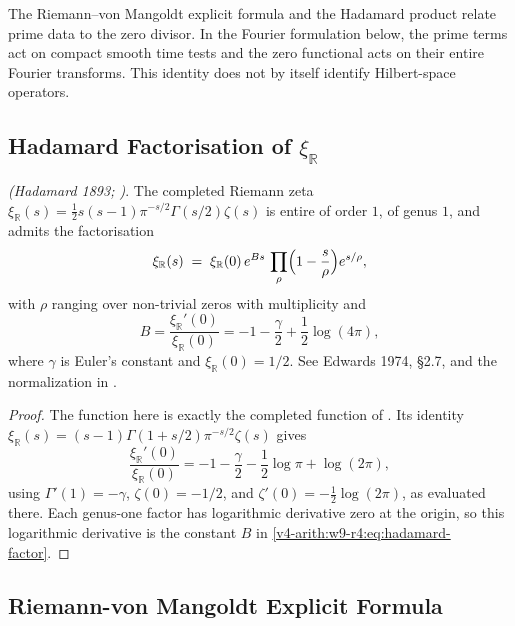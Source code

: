 The Riemann--von Mangoldt explicit formula and the Hadamard product
relate prime data to the zero divisor. In the Fourier formulation below,
the prime terms act on compact smooth time tests and the zero
functional acts on their entire Fourier transforms. This identity
does not by itself identify Hilbert-space operators.

\subsection{Hadamard Factorisation of \(\xi_{\mathbb{R}}\)}
\label{v4-arith:w9-r4:mh:hadamard}

\begin{proposition}
\label{v4-arith:w9-r4:prop:hadamard}
\ClaimStatusProvedElsewhere \emph{(Hadamard 1893;
)}. The completed Riemann zeta
\(\xi_{\mathbb{R}}(s)=\tfrac12 s(s-1)\pi^{-s/2}\Gamma(s/2)\zeta(s)\) is
entire of order \(1\), of genus \(1\), and admits the factorisation
\begin{equation}
\label{v4-arith:w9-r4:eq:hadamard-factor}
\xi_{\mathbb{R}}(s)\;=\;\xi_{\mathbb{R}}(0)\,e^{Bs}\,\prod_{\rho}\Bigl(1-\frac{s}{\rho}\Bigr)e^{s/\rho},
\end{equation}
with \(\rho\) ranging over non-trivial zeros with multiplicity and
\[
 B=\frac{\xi_{\mathbb R}'(0)}{\xi_{\mathbb R}(0)}
   =-1-\frac\gamma2+\frac12\log(4\pi),
\]
where \(\gamma\) is Euler's constant and \(\xi_{\mathbb R}(0)=1/2\).
See Edwards 1974, \S2.7, and the normalization in
.
\end{proposition}
\begin{proof}
The function here is exactly the completed function of
. Its identity
\(\xi_{\mathbb R}(s)=(s-1)\Gamma(1+s/2)\pi^{-s/2}\zeta(s)\)
gives
\[
 \frac{\xi_{\mathbb R}'(0)}{\xi_{\mathbb R}(0)}
 =-1-\frac\gamma2-\frac12\log\pi+\log(2\pi),
\]
using \(\Gamma'(1)=-\gamma\), \(\zeta(0)=-1/2\), and
\(\zeta'(0)=-\tfrac12\log(2\pi)\), as evaluated there.
Each genus-one factor has logarithmic derivative zero at the origin,
so this logarithmic derivative is the constant \(B\) in
\eqref{v4-arith:w9-r4:eq:hadamard-factor}.
\end{proof}

\subsection{Riemann-von Mangoldt Explicit Formula}
\label{v4-arith:w9-r4:mh:rvm}

